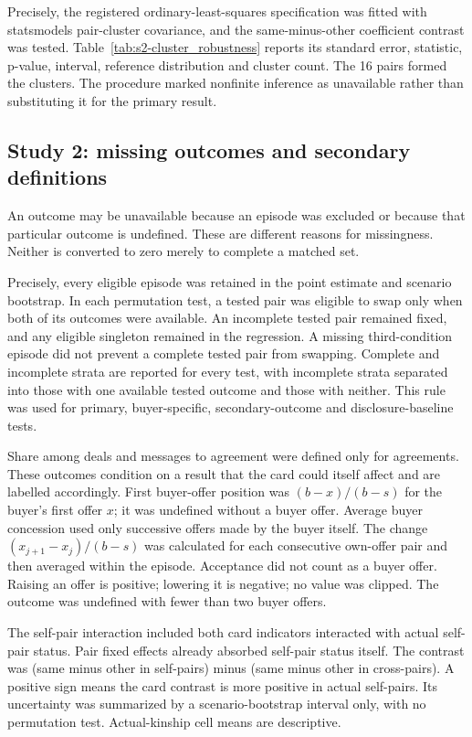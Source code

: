 Precisely, the registered ordinary-least-squares specification was fitted with statsmodels pair-cluster covariance, and the same-minus-other coefficient contrast was tested. Table~\ref{tab:s2-cluster_robustness} reports its standard error, statistic, p-value, interval, reference distribution and cluster count. The 16 pairs formed the clusters. The procedure marked nonfinite inference as unavailable rather than substituting it for the primary result.

\subsection{Study 2: missing outcomes and secondary definitions}
\label{subapp:study-2-missing-outcomes-and-secondary-definitions}
An outcome may be unavailable because an episode was excluded or because that particular outcome is undefined. These are different reasons for missingness. Neither is converted to zero merely to complete a matched set.

Precisely, every eligible episode was retained in the point estimate and scenario bootstrap. In each permutation test, a tested pair was eligible to swap only when both of its outcomes were available. An incomplete tested pair remained fixed, and any eligible singleton remained in the regression. A missing third-condition episode did not prevent a complete tested pair from swapping. Complete and incomplete strata are reported for every test, with incomplete strata separated into those with one available tested outcome and those with neither. This rule was used for primary, buyer-specific, secondary-outcome and disclosure-baseline tests.

Share among deals and messages to agreement were defined only for agreements. These outcomes condition on a result that the card could itself affect and are labelled accordingly. First buyer-offer position was $(b-x)/(b-s)$ for the buyer's first offer $x$; it was undefined without a buyer offer. Average buyer concession used only successive offers made by the buyer itself. The change $(x_{j+1}-x_j)/(b-s)$ was calculated for each consecutive own-offer pair and then averaged within the episode. Acceptance did not count as a buyer offer. Raising an offer is positive; lowering it is negative; no value was clipped. The outcome was undefined with fewer than two buyer offers.

The self-pair interaction included both card indicators interacted with actual self-pair status. Pair fixed effects already absorbed self-pair status itself. The contrast was (same minus other in self-pairs) minus (same minus other in cross-pairs). A positive sign means the card contrast is more positive in actual self-pairs. Its uncertainty was summarized by a scenario-bootstrap interval only, with no permutation test. Actual-kinship cell means are descriptive.

